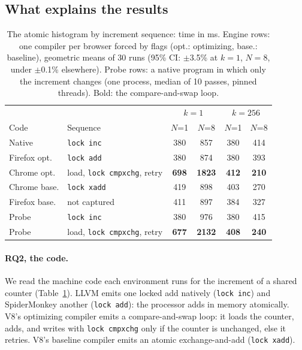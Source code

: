 \documentclass[sigplan]{acmart}
\begin{document}
\subsection{What explains the results}

\begin{table}[t]
\caption{The atomic histogram by increment sequence: time in ms. Engine
rows: one compiler per browser forced by flags (opt.: optimizing, base.:
baseline), geometric means of 30 runs (95\% CI: $\pm$3.5\% at $k=1$, $N=8$,
under $\pm$0.1\% elsewhere). Probe rows: a native program in which only the
increment changes (one process, median of 10 passes, pinned threads). Bold:
the compare-and-swap loop.}
\label{tab:sequence}
\footnotesize
\setlength{\tabcolsep}{2.5pt}
\begin{tabular}{llcccc}
\toprule
& & \multicolumn{2}{c}{$k=1$} & \multicolumn{2}{c}{$k=256$} \\
Code & Sequence & $N$=1 & $N$=8 & $N$=1 & $N$=8 \\
\midrule
Native & \texttt{lock inc} & 380 & 857 & 380 & 414 \\
Firefox opt. & \texttt{lock add} & 380 & 874 & 380 & 393 \\
Chrome opt. & load, \texttt{lock cmpxchg}, retry & \textbf{698} & \textbf{1823} & \textbf{412} & \textbf{210} \\
Chrome base. & \texttt{lock xadd} & 419 & 898 & 403 & 270 \\
Firefox base. & not captured & 411 & 897 & 384 & 327 \\
\midrule
Probe & \texttt{lock inc} & 380 & 976 & 380 & 415 \\
Probe & load, \texttt{lock cmpxchg}, retry & \textbf{677} & \textbf{2132} & \textbf{408} & \textbf{240} \\
\bottomrule
\end{tabular}
\end{table}

\paragraph{RQ2, the code.} We read the machine code each environment runs
for the increment of a shared counter (Table~\ref{tab:sequence}). LLVM
emits one locked add natively (\texttt{lock inc}) and SpiderMonkey another
(\texttt{lock add}): the processor adds in memory atomically. V8's
optimizing compiler emits a compare-and-swap loop: it loads the counter,
adds, and writes with \texttt{lock cmpxchg} only if the counter is
unchanged, else it retries. V8's baseline compiler emits an atomic
exchange-and-add (\texttt{lock xadd}).
\end{document}
